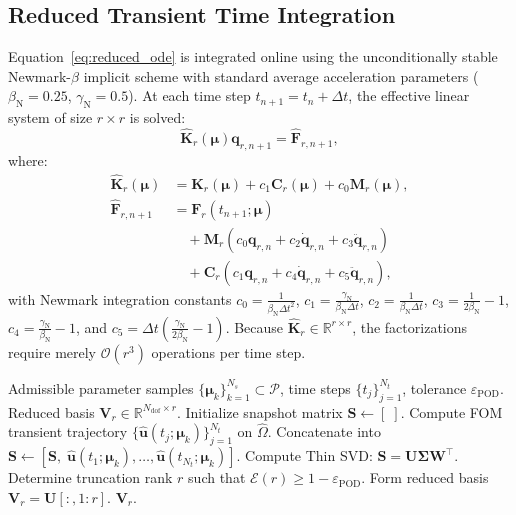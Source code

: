 \subsection{Reduced Transient Time Integration}
\label{subsec:reduced_time_integration}
Equation~\eqref{eq:reduced_ode} is integrated online using the unconditionally stable Newmark-$\beta$ implicit scheme with standard average acceleration parameters ($\beta_{\text{N}} = 0.25$, $\gamma_{\text{N}} = 0.5$). At each time step $t_{n+1} = t_n + \Delta t$, the effective linear system of size $r \times r$ is solved:
\begin{equation}
    \hat{\bm{K}}_r(\bm{\mu}) \bm{q}_{r, n+1} = \hat{\bm{F}}_{r, n+1},
    \label{eq:effective_reduced_system}
\end{equation}
where:
\begin{align}
    \hat{\bm{K}}_r(\bm{\mu}) &= \bm{K}_r(\bm{\mu}) + c_1 \bm{C}_r(\bm{\mu}) + c_0 \bm{M}_r(\bm{\mu}), \\
    \hat{\bm{F}}_{r, n+1} &= \bm{F}_r(t_{n+1}; \bm{\mu}) \nonumber \\
    &\quad + \bm{M}_r \left( c_0 \bm{q}_{r,n} + c_2 \dot{\bm{q}}_{r,n} + c_3 \ddot{\bm{q}}_{r,n} \right) \nonumber \\
    &\quad + \bm{C}_r \left( c_1 \bm{q}_{r,n} + c_4 \dot{\bm{q}}_{r,n} + c_5 \ddot{\bm{q}}_{r,n} \right),
\end{align}
with Newmark integration constants $c_0 = \frac{1}{\beta_{\text{N}} \Delta t^2}$, $c_1 = \frac{\gamma_{\text{N}}}{\beta_{\text{N}} \Delta t}$, $c_2 = \frac{1}{\beta_{\text{N}} \Delta t}$, $c_3 = \frac{1}{2\beta_{\text{N}}} - 1$, $c_4 = \frac{\gamma_{\text{N}}}{\beta_{\text{N}}} - 1$, and $c_5 = \Delta t \left(\frac{\gamma_{\text{N}}}{2\beta_{\text{N}}} - 1\right)$. Because $\hat{\bm{K}}_r \in \mathbb{R}^{r \times r}$, the factorizations require merely $\mathcal{O}(r^3)$ operations per time step.

\begin{algorithm}[htbp]
\caption{Offline Snapshot Collection and IGA-POD Basis Generation}
\label{alg:pod_basis_generation}
\begin{algorithmic}[1]
\Require Admissible parameter samples $\{\bm{\mu}_k\}_{k=1}^{N_s} \subset \mathcal{P}$, time steps $\{t_j\}_{j=1}^{N_t}$, tolerance $\varepsilon_{\text{POD}}$.
\Ensure Reduced basis $\bm{V}_r \in \mathbb{R}^{N_{\text{dof}} \times r}$.
\State Initialize snapshot matrix $\bm{S} \gets [\;]$.
    \State Compute FOM transient trajectory $\{\hat{\bm{u}}(t_j; \bm{\mu}_k)\}_{j=1}^{N_t}$ on $\hat{\Omega}$.
    \State Concatenate into $\bm{S} \gets [\bm{S}, \; \hat{\bm{u}}(t_1; \bm{\mu}_k), \dots, \hat{\bm{u}}(t_{N_t}; \bm{\mu}_k)]$.
\EndFor
\State Compute Thin SVD: $\bm{S} = \bm{U} \bm{\Sigma} \bm{W}^\top$.
\State Determine truncation rank $r$ such that $\mathcal{E}(r) \ge 1 - \varepsilon_{\text{POD}}$.
\State Form reduced basis $\bm{V}_r = \bm{U}[:, 1:r]$.
\State \Return $\bm{V}_r$.
\end{algorithmic}
\end{algorithm}
